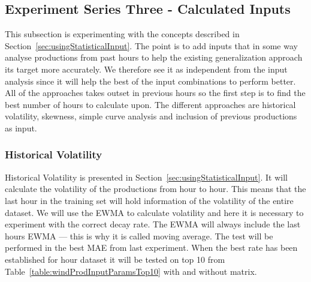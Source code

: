 
\subsection{Experiment Series Three - Calculated Inputs}
This subsection is experimenting with the concepts described in Section~\ref{sec:usingStatisticalInput}. The point is to add inputs that in some way analyse productions from past hours to help the existing generalization approach its target more accurately. We therefore see it as independent from the input analysis since it will help the best of the input combinations to perform better. All of the approaches takes outset in previous hours so the first step is to find the best number of hours to calculate upon. The different approaches are historical volatility, skewness, simple curve analysis and inclusion of previous productions as input. 

\subsubsection{Historical Volatility}
Historical Volatility is presented in Section~\ref{sec:usingStatisticalInput}. It will calculate the volatility of the productions from hour to hour. This means that the last hour in the training set will hold information of the volatility of the entire dataset. We will use the EWMA to calculate volatility  and here it is necessary to experiment with the correct decay rate. The EWMA will always include the last hours EWMA --- this is why it is called moving average. The test will be performed in the best MAE from last experiment. When the best rate has been established for hour dataset it will be tested on top 10 from Table~\ref{table:windProdInputParamsTop10} with and without matrix.

